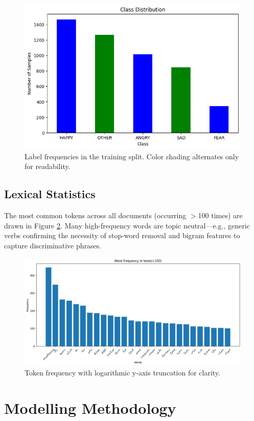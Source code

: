 \documentclass[12pt]{article}
\begin{document}
\begin{figure}[H]
  \centering
  \includegraphics[width=.70\textwidth]{output2.png}
  \caption{Label frequencies in the training split.  Color shading alternates only for readability.}
  \label{fig:classdist}
\end{figure}

\subsection{Lexical Statistics}
The most common tokens across all documents (occurring $>$100 times) are drawn in
Figure \ref{fig:wordfreq}.  Many high-frequency words are topic neutral—e.g., generic verbs confirming the necessity of stop-word removal and bigram features
to capture discriminative phrases.

\begin{figure}[H]
  \centering
  \includegraphics[width=\textwidth]{output.png}
  \caption{Token frequency with logarithmic y-axis truncation for clarity.}
  \label{fig:wordfreq}
\end{figure}

\section{Modelling Methodology}
\label{sec:method}
\end{document}
